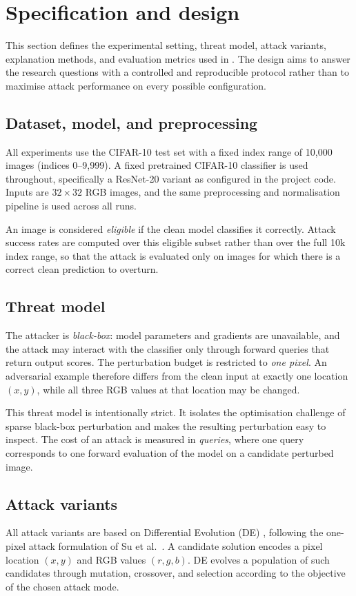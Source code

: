 \section{Specification and design}
\label{sec:method}

This section defines the experimental setting, threat model, attack variants, explanation methods, and evaluation metrics used in .
The design aims to answer the research questions with a controlled and reproducible protocol rather than to maximise attack performance on every possible configuration.

\subsection{Dataset, model, and preprocessing}
All experiments use the CIFAR-10 test set \cite{krizhevsky2009cifar} with a fixed index range of 10{,}000 images (indices 0--9{,}999).
A fixed pretrained CIFAR-10 classifier is used throughout, specifically a ResNet-20 variant as configured in the project code.
Inputs are $32\times 32$ RGB images, and the same preprocessing and normalisation pipeline is used across all runs.

An image is considered \emph{eligible} if the clean model classifies it correctly.
Attack success rates are computed over this eligible subset rather than over the full 10k index range, so that the attack is evaluated only on images for which there is a correct clean prediction to overturn.

\subsection{Threat model}
The attacker is \emph{black-box}: model parameters and gradients are unavailable, and the attack may interact with the classifier only through forward queries that return output scores.
The perturbation budget is restricted to \emph{one pixel}.
An adversarial example therefore differs from the clean input at exactly one location $(x,y)$, while all three RGB values at that location may be changed.

This threat model is intentionally strict.
It isolates the optimisation challenge of sparse black-box perturbation and makes the resulting perturbation easy to inspect.
The cost of an attack is measured in \emph{queries}, where one query corresponds to one forward evaluation of the model on a candidate perturbed image.

\subsection{Attack variants}
All attack variants are based on Differential Evolution (DE) \cite{storn1997de}, following the one-pixel attack formulation of Su et al.\ \cite{su2019onepixel}.
A candidate solution encodes a pixel location $(x,y)$ and RGB values $(r,g,b)$.
DE evolves a population of such candidates through mutation, crossover, and selection according to the objective of the chosen attack mode.


